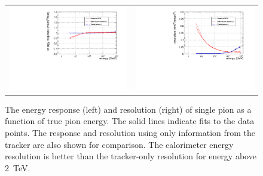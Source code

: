 \documentclass{PoS}
\begin{document}
\begin{figure}
\begin{center}
\begin{tabular}{cc}
\includegraphics[width=.5\textwidth]{figs/pi_response.pdf} & 
\includegraphics[width=.5\textwidth]{figs/pi_resolution.pdf}\\
\end{tabular}
\end{center}
\caption{The energy response (left) and resolution (right) of single 
pion as a function of true pion energy. The solid lines indicate fits to 
the data points. The response and resolution using only information from 
the tracker are also shown for comparison. The calorimeter energy resolution 
is better than the tracker-only resolution for energy above 2~TeV. }
\label{fig:piresponse}
\end{figure}
\end{document}
